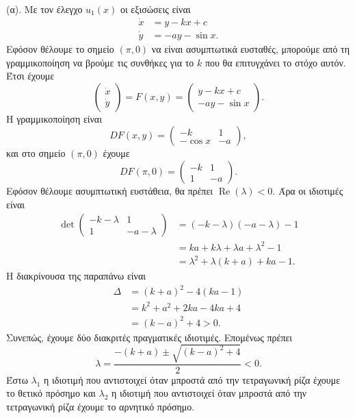 \begin{solution}
    (α). Με τον έλεγχο \( u_1(x) \) οι εξισώσεις είναι
    \begin{align*}
        \dot{x} &= y -kx + c\\
        \dot{y} &= -a y - \sin{x}.
    \end{align*}
    Εφόσον θέλουμε το σημείο \( (\pi, 0) \) να είναι ασυμπτωτικά ευσταθές,
    μπορούμε από τη γραμμικοποίηση να βρούμε τις συνθήκες για το \( k \) που θα
    επιτυγχάνει το στόχο αυτόν. Έτσι έχουμε
    \[
        \begin{pmatrix}
            \dot{x} \\
            \dot{y}
        \end{pmatrix} = F(x, y) =
        \begin{pmatrix}
            y -kx + c \\
            -a y - \sin{x}
        \end{pmatrix}.
    \]
    Η γραμμικοποίηση είναι
    \[
        DF(x, y) =
        \begin{pmatrix}
            -k & 1 \\
            -\cos{x} & -a
        \end{pmatrix},
    \]
    και στο σημείο \( (\pi, 0) \) έχουμε
    \[
        DF(\pi, 0) =
        \begin{pmatrix}
            -k & 1 \\
            1 & -a
        \end{pmatrix}.
    \]
    Εφόσον θέλουμε ασυμπτωτική ευστάθεια, θα πρέπει \(
    \operatorname{Re}(\lambda) < 0 \). Άρα οι ιδιοτιμές είναι
    \begin{align*}
        \det{\begin{pmatrix}
                -k - \lambda & 1 \\
                1 & -a - \lambda
        \end{pmatrix}} &=
        (-k - \lambda)(-a - \lambda) - 1 \\
        &= ka + k\lambda + \lambda a + \lambda^2 - 1 \\
        &= \lambda^2 + \lambda(k + a) + ka - 1.
    \end{align*}
    Η διακρίνουσα της παραπάνω είναι
    \begin{align*}
        \Delta &= (k + a)^2 - 4(ka - 1) \\
        &= k^2 + a^2 + 2ka - 4ka + 4 \\
        &= (k - a)^2 + 4 > 0.
    \end{align*}
    Συνεπώς, έχουμε δύο διακριτές πραγματικές ιδιοτιμές. Επομένως πρέπει
    \[
        \lambda = \frac{-(k + a) \pm\sqrt{(k -a)^2 + 4}}{2} < 0.
    \]
    Έστω \( \lambda_1 \) η ιδιοτιμή που αντιστοιχεί όταν μπροστά από την
    τετραγωνική ρίζα έχουμε το θετικό πρόσημο και \( \lambda_2 \) η ιδιοτιμή
    που αντιστοιχεί όταν μπροστά από την τετραγωνική ρίζα έχουμε το αρνητικό
    πρόσημο.


\end{solution}
